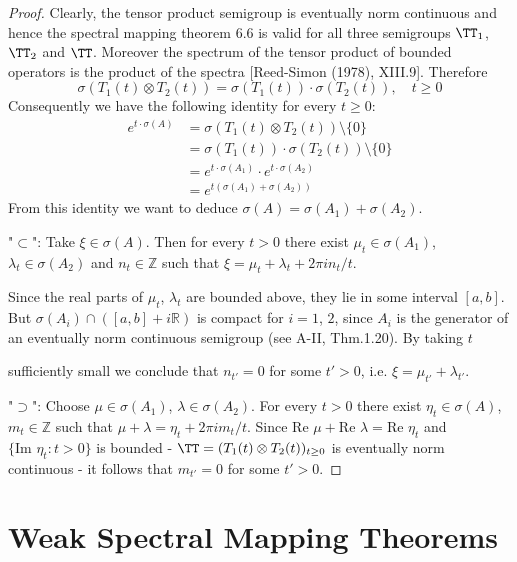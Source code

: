 \begin{proof}
	Clearly, the tensor product semigroup is eventually norm continuous and hence the spectral mapping theorem 6.6 is valid for all three semigroups $\TT_{1}$, $\TT_{2}$ and $\TT$.
	Moreover the spectrum of the tensor product of bounded operators is the product of the spectra [Reed-Simon (1978), XIII.9].
	Therefore
	\[
	\sigma(T_{1}(t)\otimes T_{2}(t)) = \sigma(T_{1}(t))\cdot\sigma(T_{2}(t)), \quad t \geq 0
	\]
	Consequently we have the following identity for every $t \geq 0$:
	\begin{align*}
		e^{t\cdot\sigma(A)} &= \sigma(T_{1}(t)\otimes T_{2}(t)) \setminus \{0\} \\
		&= \sigma(T_{1}(t))\cdot\sigma(T_{2}(t)) \setminus \{0\} \\
		&= e^{t\cdot\sigma(A_{1})}\cdot e^{t\cdot\sigma(A_{2})} \\
		&= e^{t(\sigma(A_{1})+\sigma(A_{2}))}
	\end{align*}
	From this identity we want to deduce $\sigma(A) = \sigma(A_{1}) + \sigma(A_{2})$.
	
	"$\subset$": Take $\xi \in \sigma(A)$.
	Then for every $t > 0$ there exist $\mu_{t} \in \sigma(A_{1})$, $\lambda_{t} \in \sigma(A_{2})$ and $n_{t} \in \mathbb{Z}$ such that $\xi = \mu_{t} + \lambda_{t} + 2\pi i n_{t}/t$.
	
	Since the real parts of $\mu_{t}$, $\lambda_{t}$ are bounded above, they lie in some interval $[a,b]$.
	But $\sigma(A_{i}) \cap ([a,b] + i\mathbb{R})$ is compact for $i = 1$, $2$, since $A_{i}$ is the generator of an eventually norm continuous semigroup (see A-II, Thm.1.20).
	By taking $t$

\newpage
sufficiently small we conclude that $n_{t'} = 0$ for some $t' > 0$, i.e. $\xi = \mu_{t'} + \lambda_{t'}$.

"$\supset$": Choose $\mu \in \sigma(A_{1})$, $\lambda \in \sigma(A_{2})$.
For every $t > 0$ there exist $\eta_{t} \in \sigma(A)$, $m_{t} \in \mathbb{Z}$ such that $\mu + \lambda = \eta_{t} + 2\pi i m_{t}/t$.
Since $\text{Re }\mu + \text{Re }\lambda = \text{Re }\eta_{t}$ and $\{\text{Im }\eta_{t}: t > 0\}$ is bounded - $\TT = (T_{1}(t) \otimes T_{2}(t))_{t\geq 0}$ is eventually norm continuous - it follows that $m_{t'} = 0$ for some $t' > 0$.
\end{proof}

\section{Weak Spectral Mapping Theorems}\label{sec:a3-7}

